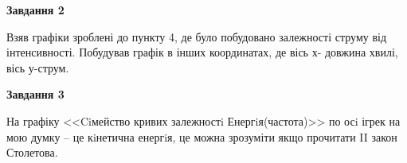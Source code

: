 \documentclass[a4paper,14pt]{extreport}
\begin{document}
	
	
	

\newpage
\begin{center}
\textbf{Завдання 2}
\end{center}
	
Взяв графіки зроблені до пункту 4, де було побудовано залежності струму від інтенсивності. Побудував графік в інших координатах, де вісь х- довжина хвилі, вісь у-струм. 
	\begin{center}
	\begin{figure}[h!]
		\label{ris2}
	\end{figure}
	\end{center}
	
	

\begin{center}
\textbf{Завдання 3}
\end{center}




	На графіку <<Ciмейство кривих залежностi Енергiя(частота)>> по осi ігрек на мою думку -- це кiнетична енергiя, це можна зрозуміти якщо прочитати II закон Столетова.
\end{document}
